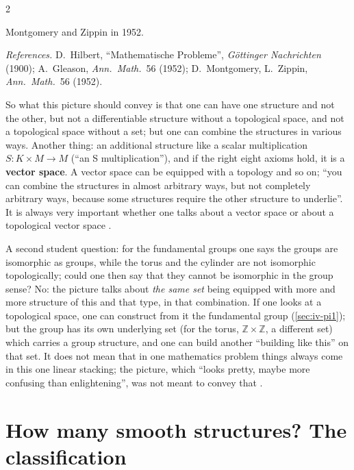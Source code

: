 \begin{paracol}{2}
\begin{history}
Montgomery and Zippin in 1952.\par
\emph{References.} D.~Hilbert, ``Mathematische Probleme'', \emph{G\"ottinger Nachrichten} (1900); A.~Gleason, \emph{Ann.\ Math.}\ 56 (1952); D.~Montgomery, L.~Zippin, \emph{Ann.\ Math.}\ 56 (1952).
\end{history}
So what this picture should convey is that one can have one structure and not the other, but not a differentiable structure without a topological space, and not a topological space without a set; but one can combine the structures in various ways. Another thing: an additional structure like a scalar multiplication
$S\colon K\times M\to M$ (``an S multiplication''), and if the right eight axioms hold, it is a \textbf{vector space}. A vector space can be equipped with a topology and so on; ``you can combine the structures in almost arbitrary ways, but not completely arbitrary ways, because some structures require the other structure to underlie''.
It is always very important whether one talks about a vector space or about a topological vector space .
\begin{secondary}
A second student question: for the fundamental groups one says the groups are isomorphic as groups, while the torus and the cylinder are not isomorphic topologically; could one then say that they cannot be isomorphic in the group sense? No: the picture talks about \emph{the same set} being equipped with more
and more structure of this and that type, in that combination. If one looks at a topological space, one can construct from it the fundamental group (\cref{sec:iv-pi1}); but the group has its own underlying set (for the torus, $\mathbb Z\times\mathbb Z$, a different set) which carries a group structure, and one can build another
``building like this'' on that set. It does not mean that in one mathematics problem things always come in this one linear stacking; the picture, which ``looks pretty, maybe more confusing than enlightening'', was not meant to convey that .
\end{secondary}

\section{How many smooth structures? The classification}\label{sec:df-classification}


\end{paracol}
